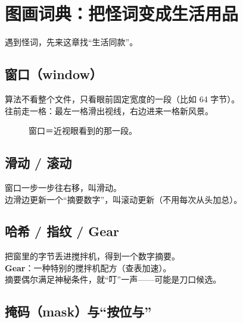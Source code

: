 \chapter{图画词典：把怪词变成生活用品}
\label{ch:N-glossary}

遇到怪词，先来这章找``生活同款''。

\section{窗口（window）}

\begin{metaphor}[火车上看风景]
算法不看整个文件，只看眼前固定宽度的一段（比如 64 字节）。\\
往前走一格：最左一格滑出视线，右边进来一格新风景。
\end{metaphor}

\begin{figure}[htbp]
\centering
{}
\caption{窗口＝近视眼看到的那一段。}
\label{fig:N-window}
\end{figure}

\section{滑动 / 滚动}

窗口一步一步往右移，叫滑动。\\
边滑边更新一个``摘要数字''，叫滚动更新（不用每次从头加总）。

\section{哈希 / 指纹 / Gear}

\begin{metaphor}[搅拌机摘要]
把窗里的字节丢进搅拌机，得到一个数字摘要。\\
\textbf{Gear}：一种特别的搅拌机配方（查表加速）。\\
摘要偶尔满足神秘条件，就``叮''一声——可能是刀口候选。
\end{metaphor}

\section{掩码（mask）与``按位与''}

